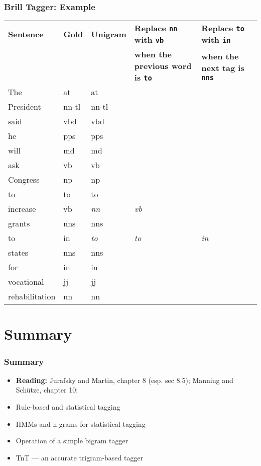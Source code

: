 \documentclass{beamer}             %
\begin{document}
\begin{frame}
  \frametitle{Brill Tagger: Example}

{\scriptsize
\begin{tabular}{lllp{4cm}p{4cm}}
\textbf{Sentence}
& \textbf{Gold}
& \textbf{Unigram}
& \textbf{Replace \texttt{nn} with \texttt{vb}}
& \textbf{Replace \texttt{to} with \texttt{in}} \\
&&& \textbf{when the previous word is \texttt{to}}
& \textbf{when the next tag is \texttt{nns}} \\ \hline
The            & at      & at \\
President      & nn-tl   & nn-tl \\
said           & vbd     & vbd \\
he             & pps     & pps \\
will           & md      & md \\
ask            & vb      & vb \\
Congress       & np      & np \\
to             & to      & to \\
increase       & vb      & \textit{nn}     &    \textit{vb} \\
grants         & nns     & nns \\
to             & in      & \textit{to}     &    \textit{to} &   \textit{in} \\
states         & nns     & nns \\
for            & in      & in \\
vocational     & jj      & jj \\
rehabilitation & nn      & nn
\end{tabular}
}
\end{frame}


\section{Summary}

\begin{frame}
  \frametitle{Summary}

  \begin{itemize}
  \item \textbf{Reading:} 
    Jurafsky and Martin, chapter 8 (esp. sec 8.5); 
    Manning and Sch\"utze, chapter 10; 
  \item Rule-based and statistical tagging
  \item HMMs and n-grams for statistical tagging
  \item Operation of a simple bigram tagger
  \item TnT --- an accurate trigram-based tagger
  \end{itemize}
\end{frame}
\end{document}

